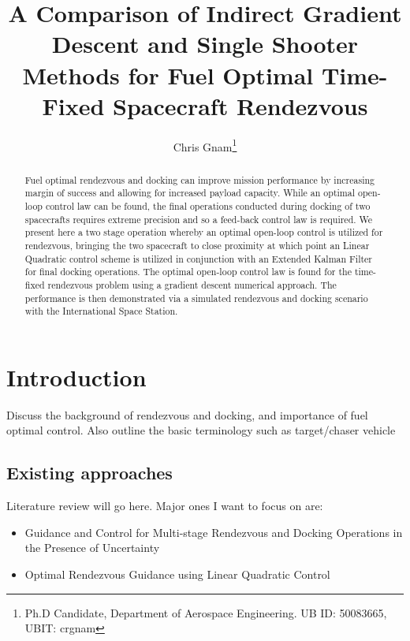 \documentclass[conf]{new-aiaa}
\title{A Comparison of Indirect Gradient Descent and Single Shooter Methods for Fuel Optimal Time-Fixed Spacecraft Rendezvous}
\author{
  Chris Gnam\footnote{Ph.D Candidate, Department of Aerospace Engineering.  UB ID: 50083665, UBIT: crgnam}
}
\begin{document}
\maketitle{}

\begin{abstract}
    Fuel optimal rendezvous and docking can improve mission performance by increasing margin of success and allowing for increased payload capacity.  While an optimal open-loop control law can be found, the final operations conducted during docking of two spacecrafts requires extreme precision and so a feed-back control law is required.  We present here a two stage operation whereby an optimal open-loop control is utilized for rendezvous, bringing the two spacecraft to close proximity at which point an Linear Quadratic control scheme is utilized in conjunction with an Extended Kalman Filter for final docking operations.  The optimal open-loop control law is found for the time-fixed rendezvous problem using a gradient descent numerical approach.  The performance is then demonstrated via a simulated rendezvous and docking scenario with the International Space Station.
\end{abstract}

\tableofcontents
\newpage


\section{Introduction}
{\color{red} Discuss the background of rendezvous and docking, and importance of fuel optimal control.  Also outline the basic terminology such as target/chaser vehicle}

\subsection{Existing approaches}
{\color{red} Literature review will go here.  Major ones I want to focus on are:
\begin{itemize}
    \item Guidance and Control for Multi-stage Rendezvous and Docking Operations in the Presence of Uncertainty \cite{jewison}
    \item Optimal Rendezvous Guidance using Linear Quadratic Control \cite{moon}
\end{itemize}
}
\end{document}
